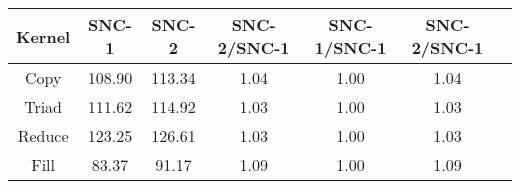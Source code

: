 \begin{tabular}{|c|c|c|c|c|c|c|}  \hline
Kernel&SNC-1&SNC-2 & SNC-2/SNC-1 & SNC-1/SNC-1 & SNC-2/SNC-1 \\ \hline 
Copy & 108.90 & 113.34  & 1.04 & 1.00 & 1.04 \\ \hline 
Triad & 111.62 & 114.92  & 1.03 & 1.00 & 1.03 \\ \hline 
Reduce & 123.25 & 126.61  & 1.03 & 1.00 & 1.03 \\ \hline 
Fill & 83.37 & 91.17  & 1.09 & 1.00 & 1.09 \\ \hline 
\end{tabular}
